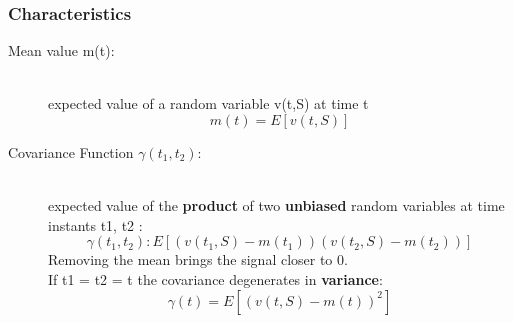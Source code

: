 \subsubsection{Characteristics}
\begin{description}
\item[Mean value m(t):] \hfill\\
expected value of a random variable v(t,S) at time t  $$ m(t) = E [v(t,S)]$$
\item[Covariance Function $ \gamma(t_1,t_2)$:] \hfill \\
expected value of the \textbf{product} of two \textbf{unbiased} random variables at time instants t1, t2 :$$ \gamma(t_1,t_2) : E[ ( v(t_1,S) - m(t_1))(v(t_2,S)-m(t_2))] $$
Removing the mean brings the signal closer to 0.\\ If t1 = t2 = t the covariance degenerates in \textbf{variance}: $$ \gamma(t) = E [ (v(t,S)- m(t))^2] $$ 
\end{description}

